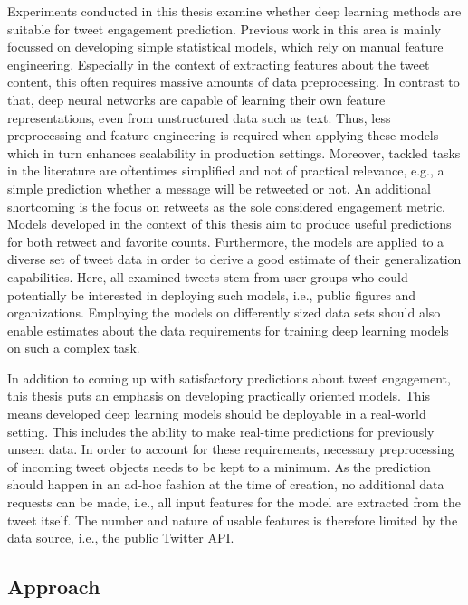 Experiments conducted in this thesis examine whether deep learning methods are
suitable for tweet engagement prediction.
Previous work in this area is mainly focussed on developing simple statistical
models, which rely on manual feature engineering.
Especially in the context of extracting features about the tweet content, this
often requires massive amounts of data preprocessing.
In contrast to that, deep neural networks are capable of learning their own 
feature representations, even from unstructured data such as text.
Thus, less preprocessing and feature engineering is required when applying
these models which in turn enhances scalability in production settings.
Moreover, tackled tasks in the literature are oftentimes simplified and not of 
practical relevance, e.g., a simple prediction whether a message will be 
retweeted or not.
An additional shortcoming is the focus on retweets as the sole considered
engagement metric.
Models developed in the context of this thesis aim to produce useful predictions
for both retweet and favorite counts.
Furthermore, the models are applied to a diverse set of tweet data in order
to derive a good estimate of their generalization capabilities.
Here, all examined tweets stem from user groups who could potentially be interested
in deploying such models, i.e., public figures and organizations.
Employing the models on differently sized data sets should also enable estimates
about the data requirements for training deep learning models on such a complex
task.

In addition to coming up with satisfactory predictions about tweet engagement,
this thesis puts an emphasis on developing practically oriented models.
This means developed deep learning models should be deployable in a real-world
setting.
This includes the ability to make real-time predictions for previously unseen
data.
In order to account for these requirements, necessary preprocessing of incoming
tweet objects needs to be kept to a minimum.
As the prediction should happen in an ad-hoc fashion at the time of creation,
no additional data requests can be made, i.e., all input features for the model
are extracted from the tweet itself.
The number and nature of usable features is therefore limited by the data source,
i.e., the public Twitter API.

\subsection{Approach}
\label{sec:approach}


